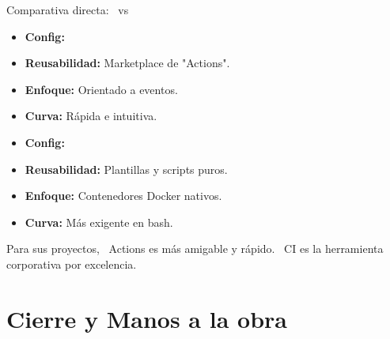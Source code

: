 \documentclass[aspectratio=169]{beamer}
\begin{document}
\begin{frame}{Comparativa directa: \faGithub\ vs \faGitlab}
    \vspace{-0.7cm}
    \begin{comparebox}
        \begin{darkbox}
            \begin{itemize}
                \item \textbf{Config:} 
                \item \textbf{Reusabilidad:} Marketplace de "Actions".
                \item \textbf{Enfoque:} Orientado a eventos.
                \item \textbf{Curva:} Rápida e intuitiva.
            \end{itemize}
        \end{darkbox}
    \comparebreak
        \begin{darkbox}
            \begin{itemize}
                \item \textbf{Config:} 
                \item \textbf{Reusabilidad:} Plantillas y scripts puros.
                \item \textbf{Enfoque:} Contenedores Docker nativos.
                \item \textbf{Curva:} Más exigente en bash.
            \end{itemize}
        \end{darkbox}
    \end{comparebox}
    \begin{alertbox}[Conclusión]
    Para sus proyectos, \faGithub\ Actions es más amigable y rápido. \faGitlab\ CI es la herramienta corporativa por excelencia.
    \end{alertbox}
\end{frame}

\section{Cierre y Manos a la obra}


\end{document}

